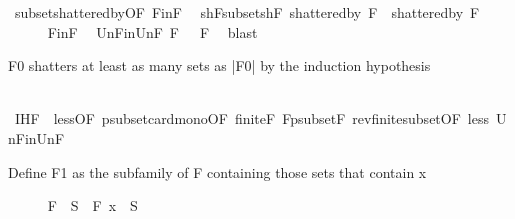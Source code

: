 \begin{isabellebody}
\ subset{\isacharunderscore}{\kern0pt}shattered{\isacharunderscore}{\kern0pt}by{\isacharbrackleft}{\kern0pt}OF\ F{}{\isacharunderscore}{\kern0pt}in{\isacharunderscore}{\kern0pt}F{\isacharbrackright}{\kern0pt}\ \isamarkupfalse%
\ shF{}{\isacharunderscore}{\kern0pt}subset{\isacharunderscore}{\kern0pt}shF{\isacharcolon}{\kern0pt}\ {\isachardoublequoteopen}shattered{\isacharunderscore}{\kern0pt}by\ {\isacharquery}{\kern0pt}F{}\ {\isasymsubseteq}\ shattered{\isacharunderscore}{\kern0pt}by\ F{\isachardoublequoteclose}\ \isacommand{{\isachardot}{\kern0pt}}\isamarkupfalse%
\isanewline
\ \ \ \ \isamarkupfalse%
\ F{}{\isacharunderscore}{\kern0pt}in{\isacharunderscore}{\kern0pt}F\ \isamarkupfalse%
\ Un{\isacharunderscore}{\kern0pt}F{}{\isacharunderscore}{\kern0pt}in{\isacharunderscore}{\kern0pt}Un{\isacharunderscore}{\kern0pt}F{\isacharcolon}{\kern0pt}{\isachardoublequoteopen}{\isasymUnion}\ {\isacharquery}{\kern0pt}F{}\ {\isasymsubseteq}\ {\isasymUnion}\ F{\isachardoublequoteclose}\ \isamarkupfalse%
\ blast%
\begin{isamarkuptext}%
F0 shatters at least as many sets as |F0| by the induction hypothesis%
\end{isamarkuptext}\isamarkuptrue%
\ \ \ \ \isamarkupfalse%
\ IH{\isacharunderscore}{\kern0pt}F{}\ {\isacharequal}{\kern0pt}\ less{\isacharparenleft}{\kern0pt}{}{\isacharparenright}{\kern0pt}{\isacharbrackleft}{\kern0pt}OF\ psubset{\isacharunderscore}{\kern0pt}card{\isacharunderscore}{\kern0pt}mono{\isacharbrackleft}{\kern0pt}OF\ finite{\isacharunderscore}{\kern0pt}F\ F{}{\isacharunderscore}{\kern0pt}psubset{\isacharunderscore}{\kern0pt}F{\isacharbrackright}{\kern0pt}\ rev{\isacharunderscore}{\kern0pt}finite{\isacharunderscore}{\kern0pt}subset{\isacharbrackleft}{\kern0pt}OF\ less{\isacharparenleft}{\kern0pt}{}{\isacharparenright}{\kern0pt}\ Un{\isacharunderscore}{\kern0pt}F{}{\isacharunderscore}{\kern0pt}in{\isacharunderscore}{\kern0pt}Un{\isacharunderscore}{\kern0pt}F{\isacharbrackright}{\kern0pt}{\isacharbrackright}{\kern0pt}%
\begin{isamarkuptext}%
Define F1 as the subfamily of F containing those sets that contain x%
\end{isamarkuptext}\isamarkuptrue%
\ \ \ \ \isamarkupfalse%
\ {\isacharquery}{\kern0pt}F{}\ {\isacharequal}{\kern0pt}\ {\isachardoublequoteopen}{\isacharbraceleft}{\kern0pt}S\ {\isasymin}\ F{\isachardot}{\kern0pt}\ x\ {\isasymin}\ S{\isacharbraceright}{\kern0pt}{\isachardoublequoteclose}\isanewline

\end{isabellebody}
